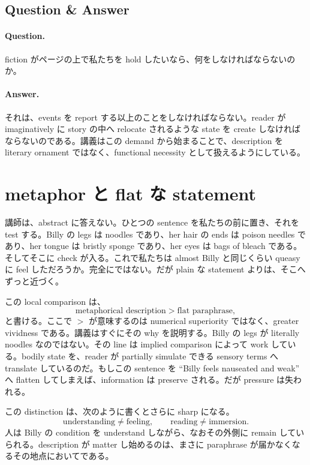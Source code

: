 \subsection{Question \& Answer}

\paragraph{Question.} fiction がページの上で私たちを hold したいなら、何をしなければならないのか。

\paragraph{Answer.} それは、events を report する以上のことをしなければならない。reader が imaginatively に story の中へ relocate されるような state を create しなければならないのである。講義はこの demand から始まることで、description を literary ornament ではなく、functional necessity として扱えるようにしている。

\section{metaphor と flat な statement}

講師は、abstract に答えない。ひとつの sentence を私たちの前に置き、それを test する。Billy の legs は noodles であり、her hair の ends は poison needles であり、her tongue は bristly sponge であり、her eyes は bags of bleach である。そしてそこに check が入る。これで私たちは almost Billy と同じくらい queasy に feel しただろうか。完全にではない。だが plain な statement よりは、そこへずっと近づく。

この local comparison は、
\begin{equation}
\text{metaphorical description} > \text{flat paraphrase},
\end{equation}
と書ける。ここで \(>\) が意味するのは numerical superiority ではなく、greater vividness である。講義はすぐにその why を説明する。Billy の legs が literally noodles なのではない。その line は implied comparison によって work している。bodily state を、reader が partially simulate できる sensory terms へ translate しているのだ。もしこの sentence を ``Billy feels nauseated and weak'' へ flatten してしまえば、information は preserve される。だが pressure は失われる。

この distinction は、次のように書くとさらに sharp になる。
\begin{equation}
\text{understanding} \neq \text{feeling}, \qquad
\text{reading} \neq \text{immersion}.
\end{equation}
人は Billy の condition を understand しながら、なおその外側に remain していられる。description が matter し始めるのは、まさに paraphrase が届かなくなるその地点においてである。

